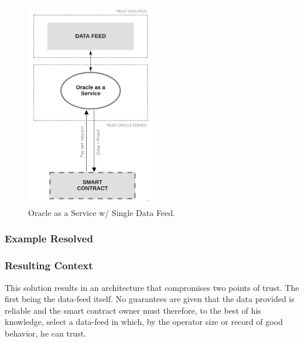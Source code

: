 \begin{figure}[t]
  \begin{center}
    \leavevmode
    \includegraphics[width=0.5\textwidth]{figures/oraclearch1.jpg}
    \caption{Oracle as a Service w/ Single Data Feed.}
    \label{fig:/figures/paper-screening}
  \end{center}
\end{figure}

\subsubsection{Example Resolved}


\subsubsection{Resulting Context}
This solution results in an architecture that compromises two points of trust. The first being the data-feed itself. No guarantees are given that the data provided is reliable and the smart contract owner must therefore, to the best of his knowledge, select a data-feed in which, by the operator size or record of good behavior, he can trust.

